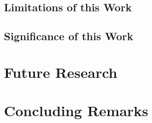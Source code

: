 \subsection{Limitations of this Work}


\subsection{Significance of this Work}


\section{Future Research}


\section{Concluding Remarks}


